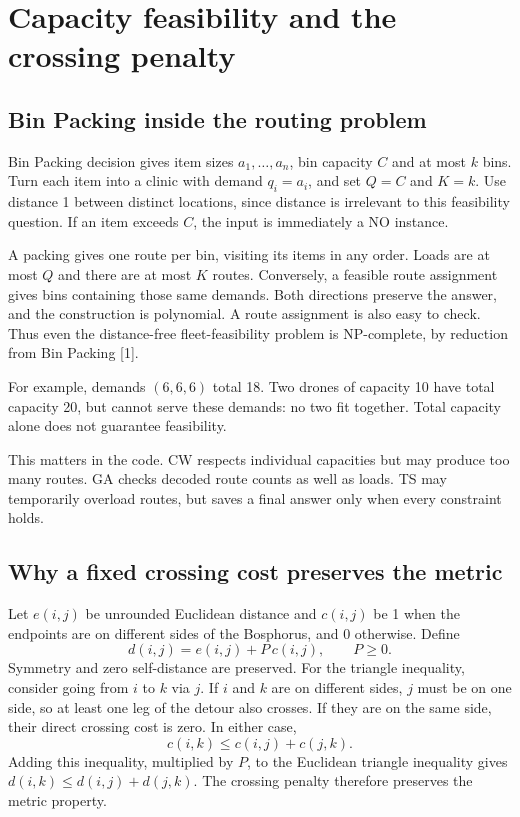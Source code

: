 \section{Capacity feasibility and the crossing penalty}
\subsection*{Bin Packing inside the routing problem}
Bin Packing decision gives item sizes $a_1,\ldots,a_n$, bin capacity $C$ and at most $k$ bins.
Turn each item into a clinic with demand $q_i=a_i$, and set $Q=C$ and $K=k$. Use distance 1
between distinct locations, since distance is irrelevant to this feasibility question. If an
item exceeds $C$, the input is immediately a NO instance.

A packing gives one route per bin, visiting its items in any order. Loads are at most $Q$ and
there are at most $K$ routes. Conversely, a feasible route assignment gives bins containing
those same demands. Both directions preserve the answer, and the construction is polynomial.
A route assignment is also easy to check. Thus even the distance-free fleet-feasibility problem
is NP-complete, by reduction from Bin Packing [1].

For example, demands $(6,6,6)$ total 18. Two drones of capacity 10 have total capacity 20, but
cannot serve these demands: no two fit together. Total capacity alone does not guarantee feasibility.

This matters in the code. CW respects individual capacities but may produce too many routes.
GA checks decoded route counts as well as loads. TS may temporarily overload routes, but saves
a final answer only when every constraint holds.

\subsection*{Why a fixed crossing cost preserves the metric}
Let $e(i,j)$ be unrounded Euclidean distance and $c(i,j)$ be 1 when the endpoints are on different
sides of the Bosphorus, and 0 otherwise. Define
\[
 d(i,j)=e(i,j)+P\,c(i,j),\qquad P\ge0.
\]
Symmetry and zero self-distance are preserved. For the triangle inequality, consider going from
$i$ to $k$ via $j$. If $i$ and $k$ are on different sides, $j$ must be on one side, so at least
one leg of the detour also crosses. If they are on the same side, their direct crossing cost is
zero. In either case,
\[
 c(i,k)\le c(i,j)+c(j,k).
\]
Adding this inequality, multiplied by $P$, to the Euclidean triangle inequality gives
$d(i,k)\le d(i,j)+d(j,k)$. The crossing penalty therefore preserves the metric property.

